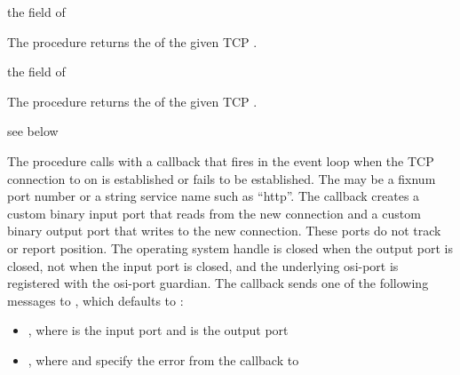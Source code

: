 \begin{procedure}
\end{procedure}
\returns{} the  field of 

The  procedure returns the  of
the given TCP .

\begin{procedure}
\end{procedure}
\returns{} the  field of 

The  procedure returns the
 of the given TCP .

\begin{procedure}
\end{procedure}
\returns{} see below

The  procedure calls  with
a callback that fires in the event loop when the TCP connection to
 on  is established or fails to be
established.  The  may be a fixnum port number or a
string service name such as ``http''. The callback creates a custom
binary input port that reads from the new connection and a custom
binary output port that writes to the new connection. These ports do
not track or report position. The operating system handle is closed
when the output port is closed, not when the input port is closed, and
the underlying osi-port is registered with the osi-port
guardian.  The callback sends one of the
following messages to , which defaults to :

\begin{itemize}
\item {}, where  is the input port and  is the
  output port
\item {}, where  and  specify the
  error from the callback to 
\end{itemize}

